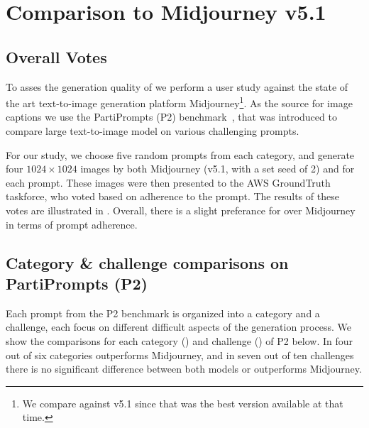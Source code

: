 \documentclass{article}
\begin{document}
\newpage
\section{Comparison to Midjourney v5.1}

\subsection{Overall Votes}
To asses the generation quality of \modelname{} we perform a user study against the state of the art text-to-image generation platform Midjourney\footnote{We compare against v5.1 since that was the best version available at that time.}.
As the source for image captions we use the PartiPrompts (P2) benchmark~\cite{yu2022scaling}, that was introduced to compare large text-to-image model on various challenging prompts.

For our study, we choose five random prompts from each category, and generate four $1024 \times 1024$ images by both Midjourney (v5.1, with a set seed of 2) and \modelname{} for each prompt.  These images were then presented to the AWS GroundTruth taskforce, who voted based on adherence to the prompt. The results of these votes are illustrated in .
Overall, there is a slight preferance for \modelname{} over Midjourney in terms of prompt adherence.
\mjcompzero
\subsection{Category \& challenge comparisons on PartiPrompts (P2)}
Each prompt from the P2 benchmark is organized into a category and a challenge, each focus on different difficult aspects of the generation process.
We show the comparisons for each category () and challenge () of P2 below.
In four out of six categories \modelname{} outperforms Midjourney, and in seven out of ten challenges there is no significant difference between both models or \modelname{} outperforms Midjourney.
\mjcompuno
\mjcompdue

\newpage
\end{document}
